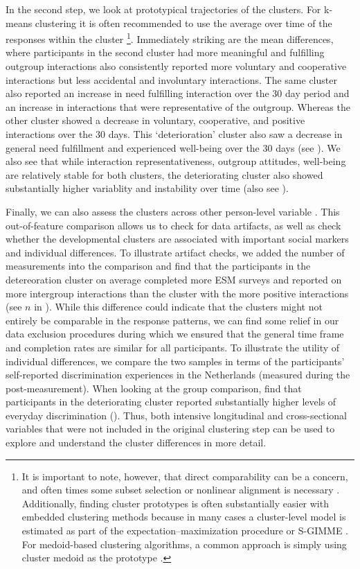In the second step, we look at prototypical trajectories of the
clusters. For k-means clustering it is often recommended to use the
average over time of the responses within the cluster
\citep[see ;][]{niennattrakul2007}\footnote{It is important to note, however, that direct comparability can be a concern, and often times some subset selection or nonlinear alignment is necessary \citep[e.g.,][]{gupta1996}. Additionally, finding cluster prototypes is often substantially easier with embedded clustering methods because in many cases a cluster-level model is estimated as part of the expectation–maximization procedure \citep[e.g.,][]{denteuling2021} or S-GIMME \citep[e.g.][]{lane2019}. For medoid-based clustering algorithms, a common approach is simply using cluster medoid as the prototype \citep{kaufman1990}.}.
Immediately striking are the mean differences, where participants in the
second cluster had more meaningful and fulfilling outgroup interactions
also consistently reported more voluntary and cooperative interactions
but less accidental and involuntary interactions. The same cluster also
reported an increase in need fulfilling interaction over the 30 day
period and an increase in interactions that were representative of the
outgroup. Whereas the other cluster showed a decrease in voluntary,
cooperative, and positive interactions over the 30 days. This
`deterioration' cluster also saw a decrease in general need fulfillment
and experienced well-being over the 30 days (see
). We also see that while interaction
representativeness, outgroup attitudes, well-being are relatively stable
for both clusters, the deteriorating cluster also showed substantially
higher variablity and instability over time (also see
).

Finally, we can also assess the clusters across other person-level
variable \citep[e.g.,][]{monden2022}. This out-of-feature comparison
allows us to check for data artifacts, as well as check whether the
developmental clusters are associated with important social markers and
individual differences. To illustrate artifact checks, we added the
number of measurements into the comparison and find that the
participants in the detereoration cluster on average completed more ESM
surveys and reported on more intergroup interactions than the cluster
with the more positive interactions (see \(n\) in
). While this difference could indicate
that the clusters might not entirely be comparable in the response
patterns, we can find some relief in our data exclusion procedures
during which we ensured that the general time frame and completion rates
are similar for all participants. To illustrate the utility of
individual differences, we compare the two samples in terms of the
participants' self-reported discrimination experiences in the
Netherlands (measured during the post-measurement). When looking at the
group comparison, find that participants in the deteriorating cluster
reported substantially higher levels of everyday discrimination
(). Thus, both intensive longitudinal and
cross-sectional variables that were not included in the original
clustering step can be used to explore and understand the cluster
differences in more detail.

